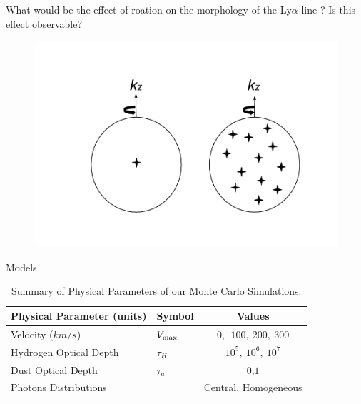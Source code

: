 \documentclass{beamer}
\begin{document}

\begin{frame}
\LARGE{What would be the effect of roation on the morphology of the Ly$\alpha$ line ? 
Is this effect observable?} 
\end{frame}


\begin{frame}
\begin{figure}
\includegraphics[scale=0.3]{Figures/models.png}
\end{figure}
\end{frame}

\begin{frame}{Models}
\begin{table}
\begin{center}
\begin{tabular}{llc}\hline\hline
Physical Parameter (units) & Symbol & Values\\\hline
Velocity ($km/s$) & $V_{\rm max}$&$0,\ \ 100,\ 200,\ 300$\\
Hydrogen Optical Depth & $\tau_{H} $ & $10^{5},\ 10^{6},\ 10^{7}$\\
Dust Optical Depth & $\tau_{a}$ & $0$,$1$\\
Photons Distributions & & Central, Homogeneous\\\hline\hline
\end{tabular}
\caption{Summary of Physical Parameters of our Monte Carlo Simulations.}
\end{center}
\end{table}
\end{frame}
\end{document}
